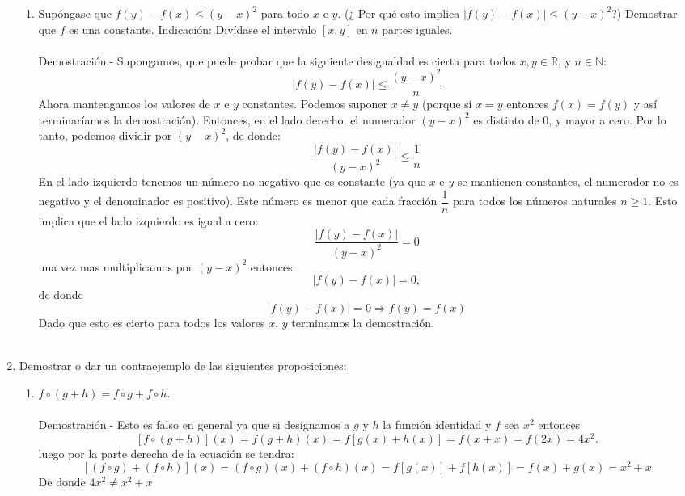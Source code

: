 \begin{enumerate}[\bfseries 1.]
\begin{enumerate}[\bfseries (a)]
	    \item Supóngase que $f(y) - f(x) \leq (y-x)^2$ para todo $x$ e $y.$ (¿ Por qué esto implica $|f(y) - f(x)| \leq (y-x)^2$?) Demostrar que $f$ es una constante. Indicación: Divídase el intervalo $[x,y]$ en $n$ partes iguales.\\\\
		Demostración.-\; Supongamos, que puede probar que la siguiente desigualdad es cierta para todos $x , y \in \mathbb{R}$, y $n \in \mathbb{N}$: $$|f(y) - f(x)| \leq \dfrac{(y-x)^2}{n}$$ Ahora mantengamos los valores de $x$ e $y$ constantes. Podemos suponer $x\neq y$ (porque si $x=y$ entonces $f(x)=f(y)$ y así terminaríamos la demostración). Entonces, en el lado derecho, el numerador $(y-x)^2$ es distinto de $0$, y mayor a cero. Por lo tanto, podemos dividir por $(y-x)^2$, de donde: $$\dfrac{|f(y) - f(x)|}{(y-x)^2} \leq \dfrac{1}{n}$$ En el lado izquierdo tenemos un número no negativo que es constante (ya que $x$ e $y$ se mantienen constantes, el numerador no es negativo y el denominador es positivo). Este número es menor que cada fracción $\dfrac{1}{n}$ para todos los números naturales $n\geq 1$. Esto implica que el lado izquierdo es igual a cero:
		$$\dfrac{|f(y) - f(x)|}{(y-x)^2} = 0$$ una vez mas multiplicamos por $(y-x)^2$ entonces $$|f(y)-f(x)|=0,$$ de donde $$|f(y)-f(x)|=0 \Longrightarrow f(y)=f(x)$$
		Dado que esto es cierto para todos los valores $x$, $y$  terminamos la demostración.\\\\

	\end{enumerate}

	\item  Demostrar o dar un contraejemplo de las siguientes proposiciones:

	    \begin{enumerate}[\bfseries (a)]

		\item $f \circ (g+h) = f \circ g + f \circ h.$\\\\
		    Demostración.-\; Esto es falso en general ya que si designamos a $g$ y $h$ la función identidad y  $f$ sea $x^2$ entonces $$\left[ f \circ (g+h) \right](x) = f\left(  g + h\right)(x)=f \left[ g(x) +  h(x) \right] = f(x+x)= f(2x) = 4x^2.$$ 
		    luego por la parte derecha de la ecuación se tendra:
		    $$\left[ \left( f\circ g \right) + \left( f \circ h \right)\right]\left(x \right) = \left(f \circ g \right) \left(x\right) + \left( f \circ h \right)\left(x\right) = f\left[g\left(x\right)\right] + f\left[h \left(x\right)\right] = f\left(x\right) + g\left(x\right) = x^2 + x$$
		    De donde $4x^2 \neq x^2 + x$\\\\


\end{enumerate}
\end{enumerate}
